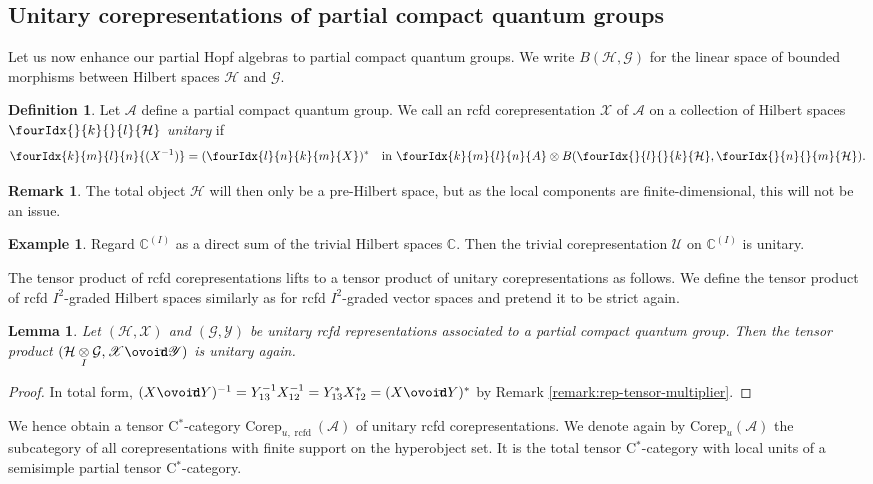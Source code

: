 \documentclass[11pt]{article}
\DeclareMathOperator{\rcf}{\mathrm{rcfd}}
\newcommand{\Corep}{\mathrm{Corep}}
\newcommand{\Circt}{{\mathop{\ooalign{$\ovoid$\cr\hidewidth\raise-.05ex\hbox{$\scriptstyle\mathsf T\mkern3.5mu$}\cr}}}} %
\newcommand{\C}{\mathbb{C}}
\newcommand{\Hsp}{\mathcal{H}}
\newcommand{\itimes}{\underset{I}{\otimes}}
\newcommand{\Gr}[5]{\fourIdx{#2}{#4}{#3}{#5}{#1}}%
\newcommand{\Gru}[3]{\Gr{#1}{}{}{#2}{#3}}
\newtheorem{Lem}[Theorem]{Lemma}
\theoremstyle{definition}
\newtheorem{Def}[Theorem]{Definition}
\newtheorem{Rem}[Theorem]{Remark}
\newtheorem{Exa}[Theorem]{Example}
\numberwithin{equation}{section}
\begin{document}
\subsection{Unitary corepresentations of partial compact quantum groups}


Let us now enhance our partial Hopf algebras to partial compact
quantum groups. We write $B(\Hsp,\mathcal{G})$ for the linear space of
bounded morphisms between Hilbert spaces $\Hsp$ and $\mathcal{G}$. 

\begin{Def} Let $\mathscr{A}$ define a partial compact quantum
  group. We call an rcfd corepresentation $\mathscr{X}$ of $\mathscr{A}$ on a collection of Hilbert spaces $\Gru{\Hsp}{k}{l}$ 
   \emph{unitary}
  if \[\Gr{(X^{-1})}{k}{l}{m}{n}=(\Gr{X}{l}{k}{n}{m})^{*}\quad
  \textrm{in }\Gr{A}{k}{l}{m}{n}\otimes
  B(\Gru{\Hsp}{l}{k},\Gru{\Hsp}{n}{m}).\]
\end{Def} 


\begin{Rem}
The total object $\Hsp$ will then only be a pre-Hilbert space, but as the local components are finite-dimensional, this will not be an issue.
\end{Rem}

\begin{Exa}\label{example:rep-trivial-unitary}
  Regard $\C^{(I)}$ as a direct sum of the trivial Hilbert spaces $\C$. Then the
  trivial corepresentation $\mathscr{U}$ on $\C^{(I)}$ is unitary.
\end{Exa}

The tensor product of rcfd corepresentations lifts to a tensor product
of unitary corepresentations as follows.  We define the tensor product
of rcfd $I^{2}$-graded Hilbert spaces similarly as for rcfd
$I^{2}$-graded vector spaces and pretend it to be strict again.
\begin{Lem}\label{lemma:rep-unitary-tensor}
  Let $(\Hsp,\mathscr{X})$ and $(\mathcal{G},\mathscr{Y})$ be unitary
  rcfd representations associated to a partial compact quantum group. Then the
  tensor product $(\Hsp \itimes \mathcal{G},\mathscr{X} \Circt
  \mathscr{Y})$ is unitary again.
\end{Lem}
\begin{proof}
In total form,  $(X\Circt Y)^{-1} = Y_{13}^{-1}X_{12}^{-1}
  =Y_{13}^{*}X_{12}^{*} = (X \Circt Y)^{*}$ by Remark \ref{remark:rep-tensor-multiplier}.
\end{proof}

We hence obtain a tensor C$^*$-category $\Corep_{u,\rcf}(\mathscr{A})$ of unitary rcfd corepresentations. We denote again by $\Corep_u(\mathscr{A})$ the subcategory of all corepresentations with finite support on the hyperobject set. It is the total tensor C$^*$-category with local units of a semisimple partial tensor C$^*$-category.
\end{document}
